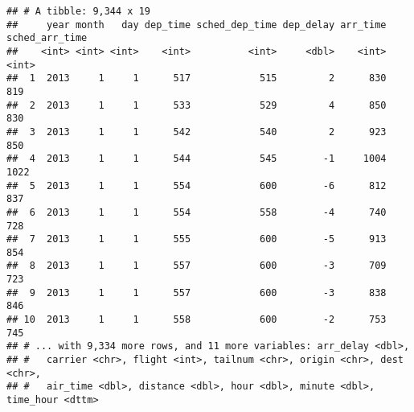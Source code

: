 \documentclass[
]{article}
\begin{document}
\begin{verbatim}
## # A tibble: 9,344 x 19
##     year month   day dep_time sched_dep_time dep_delay arr_time sched_arr_time
##    <int> <int> <int>    <int>          <int>     <dbl>    <int>          <int>
##  1  2013     1     1      517            515         2      830            819
##  2  2013     1     1      533            529         4      850            830
##  3  2013     1     1      542            540         2      923            850
##  4  2013     1     1      544            545        -1     1004           1022
##  5  2013     1     1      554            600        -6      812            837
##  6  2013     1     1      554            558        -4      740            728
##  7  2013     1     1      555            600        -5      913            854
##  8  2013     1     1      557            600        -3      709            723
##  9  2013     1     1      557            600        -3      838            846
## 10  2013     1     1      558            600        -2      753            745
## # ... with 9,334 more rows, and 11 more variables: arr_delay <dbl>,
## #   carrier <chr>, flight <int>, tailnum <chr>, origin <chr>, dest <chr>,
## #   air_time <dbl>, distance <dbl>, hour <dbl>, minute <dbl>, time_hour <dttm>
\end{verbatim}
\end{document}
